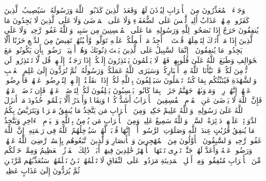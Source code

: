 \stopbuffer%
\startbuffer[\q:9:90]
وَجَاۤءَ ٱلۡمُعَذِّرُونَ مِنَ ٱلۡأَعۡرَابِ لِیُؤۡذَنَ لَهُمۡ وَقَعَدَ ٱلَّذِینَ كَذَبُوا۟ ٱللَّهَ وَرَسُولَهُۥۚ سَیُصِیبُ ٱلَّذِینَ كَفَرُوا۟ مِنۡهُمۡ عَذَابٌ أَلِیمࣱ%
\stopbuffer%
\startbuffer[\q:9:91]
لَّیۡسَ عَلَى ٱلضُّعَفَاۤءِ وَلَا عَلَى ٱلۡمَرۡضَىٰ وَلَا عَلَى ٱلَّذِینَ لَا یَجِدُونَ مَا یُنفِقُونَ حَرَجٌ إِذَا نَصَحُوا۟ لِلَّهِ وَرَسُولِهِۦۚ مَا عَلَى ٱلۡمُحۡسِنِینَ مِن سَبِیلࣲۚ وَٱللَّهُ غَفُورࣱ رَّحِیمࣱ%
\stopbuffer%
\startbuffer[\q:9:92]
وَلَا عَلَى ٱلَّذِینَ إِذَا مَاۤ أَتَوۡكَ لِتَحۡمِلَهُمۡ قُلۡتَ لَاۤ أَجِدُ مَاۤ أَحۡمِلُكُمۡ عَلَیۡهِ تَوَلَّوا۟ وَّأَعۡیُنُهُمۡ تَفِیضُ مِنَ ٱلدَّمۡعِ حَزَنًا أَلَّا یَجِدُوا۟ مَا یُنفِقُونَ%
\stopbuffer%
\startbuffer[\q:9:93]
۞ إِنَّمَا ٱلسَّبِیلُ عَلَى ٱلَّذِینَ یَسۡتَءۡذِنُونَكَ وَهُمۡ أَغۡنِیَاۤءُۚ رَضُوا۟ بِأَن یَكُونُوا۟ مَعَ ٱلۡخَوَالِفِ وَطَبَعَ ٱللَّهُ عَلَىٰ قُلُوبِهِمۡ فَهُمۡ لَا یَعۡلَمُونَ%
\stopbuffer%
\startbuffer[\q:9:94]
یَعۡتَذِرُونَ إِلَیۡكُمۡ إِذَا رَجَعۡتُمۡ إِلَیۡهِمۡۚ قُل لَّا تَعۡتَذِرُوا۟ لَن نُّؤۡمِنَ لَكُمۡ قَدۡ نَبَّأَنَا ٱللَّهُ مِنۡ أَخۡبَارِكُمۡۚ وَسَیَرَى ٱللَّهُ عَمَلَكُمۡ وَرَسُولُهُۥ ثُمَّ تُرَدُّونَ إِلَىٰ عَٰلِمِ ٱلۡغَیۡبِ وَٱلشَّهَٰدَةِ فَیُنَبِّئُكُم بِمَا كُنتُمۡ تَعۡمَلُونَ%
\stopbuffer%
\startbuffer[\q:9:95]
سَیَحۡلِفُونَ بِٱللَّهِ لَكُمۡ إِذَا ٱنقَلَبۡتُمۡ إِلَیۡهِمۡ لِتُعۡرِضُوا۟ عَنۡهُمۡۖ فَأَعۡرِضُوا۟ عَنۡهُمۡۖ إِنَّهُمۡ رِجۡسࣱۖ وَمَأۡوَىٰهُمۡ جَهَنَّمُ جَزَاۤءَۢ بِمَا كَانُوا۟ یَكۡسِبُونَ%
\stopbuffer%
\startbuffer[\q:9:96]
یَحۡلِفُونَ لَكُمۡ لِتَرۡضَوۡا۟ عَنۡهُمۡۖ فَإِن تَرۡضَوۡا۟ عَنۡهُمۡ فَإِنَّ ٱللَّهَ لَا یَرۡضَىٰ عَنِ ٱلۡقَوۡمِ ٱلۡفَٰسِقِینَ%
\stopbuffer%
\startbuffer[\q:9:97]
ٱلۡأَعۡرَابُ أَشَدُّ كُفۡرࣰا وَنِفَاقࣰا وَأَجۡدَرُ أَلَّا یَعۡلَمُوا۟ حُدُودَ مَاۤ أَنزَلَ ٱللَّهُ عَلَىٰ رَسُولِهِۦۗ وَٱللَّهُ عَلِیمٌ حَكِیمࣱ%
\stopbuffer%
\startbuffer[\q:9:98]
وَمِنَ ٱلۡأَعۡرَابِ مَن یَتَّخِذُ مَا یُنفِقُ مَغۡرَمࣰا وَیَتَرَبَّصُ بِكُمُ ٱلدَّوَاۤئِرَۚ عَلَیۡهِمۡ دَاۤئِرَةُ ٱلسَّوۡءِۗ وَٱللَّهُ سَمِیعٌ عَلِیمࣱ%
\stopbuffer%
\startbuffer[\q:9:99]
وَمِنَ ٱلۡأَعۡرَابِ مَن یُؤۡمِنُ بِٱللَّهِ وَٱلۡیَوۡمِ ٱلۡءَاخِرِ وَیَتَّخِذُ مَا یُنفِقُ قُرُبَٰتٍ عِندَ ٱللَّهِ وَصَلَوَٰتِ ٱلرَّسُولِۚ أَلَاۤ إِنَّهَا قُرۡبَةࣱ لَّهُمۡۚ سَیُدۡخِلُهُمُ ٱللَّهُ فِی رَحۡمَتِهِۦۤۚ إِنَّ ٱللَّهَ غَفُورࣱ رَّحِیمࣱ%
\stopbuffer%
\startbuffer[\q:9:100]
وَٱلسَّٰبِقُونَ ٱلۡأَوَّلُونَ مِنَ ٱلۡمُهَٰجِرِینَ وَٱلۡأَنصَارِ وَٱلَّذِینَ ٱتَّبَعُوهُم بِإِحۡسَٰنࣲ رَّضِیَ ٱللَّهُ عَنۡهُمۡ وَرَضُوا۟ عَنۡهُ وَأَعَدَّ لَهُمۡ جَنَّٰتࣲ تَجۡرِی تَحۡتَهَا ٱلۡأَنۡهَٰرُ خَٰلِدِینَ فِیهَاۤ أَبَدࣰاۚ ذَٰلِكَ ٱلۡفَوۡزُ ٱلۡعَظِیمُ%
\stopbuffer%
\startbuffer[\q:9:101]
وَمِمَّنۡ حَوۡلَكُم مِّنَ ٱلۡأَعۡرَابِ مُنَٰفِقُونَۖ وَمِنۡ أَهۡلِ ٱلۡمَدِینَةِ مَرَدُوا۟ عَلَى ٱلنِّفَاقِ لَا تَعۡلَمُهُمۡۖ نَحۡنُ نَعۡلَمُهُمۡۚ سَنُعَذِّبُهُم مَّرَّتَیۡنِ ثُمَّ یُرَدُّونَ إِلَىٰ عَذَابٍ عَظِیمࣲ%
